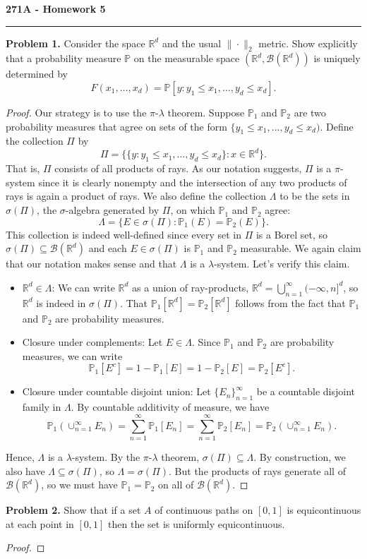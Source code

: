 \documentclass[11pt,letterpaper]{report}
\newcommand{\reals}{\mathbb{R}}
\newcommand{\mcal}[1]{\mathcal{#1}}
\newcommand{\Prob}{\mathbb{P}}
\begin{document}
\begin{center}
{\bf \Large 271A - Homework 5}
\vspace{0.2cm}
\hrule
\end{center}

\noindent\textbf{Problem 1. }
Consider the space $\reals^d$ and the usual $\|\cdot \|_2$ metric. Show explicitly that a probability measure $\Prob$ on the measurable space $(\reals^d, \mcal{B}(\reals^d))$ is uniquely determined by
\[
F(x_1, \ldots, x_d) = \Prob[y: y_1\leq x_1, \ldots, y_d\leq x_d].
\]
\begin{proof}
	Our strategy is to use the $\pi$-$\lambda$ theorem. Suppose $\Prob_1$ and $\Prob_2$ are two probability measures that agree on sets of the form $\{y_1 \leq x_1, \ldots, y_d\leq x_d)$. Define the collection $\Pi$ by
	\[
	\Pi = \big\{ \{y: y_1\leq x_1, \ldots, y_d\leq x_d\}: x\in \reals^d\big\}.
	\]
	That is, $\Pi$ consists of all products of rays. As our notation suggests, $\Pi$ is a $\pi$-system since it is clearly nonempty and the intersection of any two products of rays is again a product of rays. We also define the collection $\Lambda$ to be the sets in $\sigma(\Pi)$, the $\sigma$-algebra generated by $\Pi$, on which $\Prob_1$ and $\Prob_2$ agree:
	\[
	\Lambda = \{E \in \sigma(\Pi): \Prob_1(E) = \Prob_2(E)\}.
	\]
	This collection is indeed well-defined since every set in $\Pi$ is a Borel set, so $\sigma(\Pi)\subseteq \mcal{B}(\reals^d)$ and each $E\in \sigma(\Pi)$ is $\Prob_1$ and $\Prob_2$ measurable. We again claim that our notation makes sense and that $\Lambda$ is a $\lambda$-system. Let's verify this claim.
	\begin{itemize}
		\item $\reals^d\in \Lambda$: We can write $\reals^d$ as a union of ray-products, $\reals^d = \bigcup_{n=1}^\infty (-\infty, n]^d$, so $\reals^d$ is indeed in $\sigma(\Pi)$. That $\Prob_1[\reals^d] = \Prob_2[\reals^d]$ follows from the fact that $\Prob_1$ and $\Prob_2$ are probability measures.

		\item Closure under complements: Let $E\in \Lambda$. Since $\Prob_1$ and $\Prob_2$ are probability measures, we can write
		\[
		\Prob_1[E^c] = 1 - \Prob_1[E] = 1-\Prob_2[E] = \Prob_2[E^c].
		\]

		\item Closure under countable disjoint union: Let $\{E_n\}_{n=1}^\infty$ be a countable disjoint family in $\Lambda$. By countable additivity of measure, we have
		\[
		\Prob_1(\cup_{n=1}^\infty E_n) = \sum_{n=1}^\infty \Prob_1[E_n] = \sum_{n=1}^\infty \Prob_2[E_n] = \Prob_2(\cup_{n=1}^\infty E_n).
		\]
	\end{itemize}
	Hence, $\Lambda$ is a $\lambda$-system. By the $\pi$-$\lambda$ theorem, $\sigma(\Pi)\subseteq \Lambda$. By construction, we also have $\Lambda\subseteq \sigma(\Pi)$, so $\Lambda = \sigma(\Pi)$. But the products of rays generate all of $\mcal{B}(\reals^d)$, so we must have $\Prob_1 = \Prob_2$ on all of $\mcal{B}(\reals^d)$.
\end{proof}

\noindent\textbf{Problem 2. }
Show that if a set $A$ of continuous paths on $[0,1]$ is equicontinuous at each point in $[0,1]$ then the set is uniformly equicontinuous.
\begin{proof}
	
\end{proof}
\end{document}
